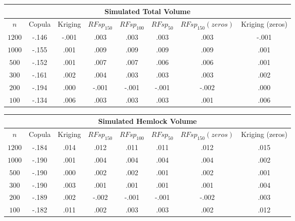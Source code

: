 \documentclass{article}
\begin{document}
\begin{center}
	\begin{singlespace}
\begin{tabular}{|| c | c c c c c c c ||}
\hline
\multicolumn{8}{||c||}{Simulated Total Volume} \\
\hline
$n$ & Copula & Kriging & $RFsp_{150}$ & $RFsp_{100}$ & $RFsp_{50}$ & $RFsp_{150}(zeros)$ & Kriging (zeros) \\ [.5ex] 
\hline\hline
$1200$ & \cellcolor{gray}-.146 & \cellcolor{cyan}-.001 & .003 & .003 & .003 & .003 & \cellcolor{cyan}-.001 \\
$1000$ & \cellcolor{gray}-.155 & \cellcolor{cyan}.001 & .009 & .009 & .009 & .009 & \cellcolor{cyan}.001 \\
$500$ & \cellcolor{gray}-.152 & \cellcolor{cyan}.001 & .007 & .007 & .006 & .006 & \cellcolor{cyan}.001 \\
$300$ & \cellcolor{gray}-.161 & \cellcolor{cyan}.002 & .004 & .003 & .003 & .003 & \cellcolor{cyan}.002 \\
$200$ & \cellcolor{gray}-.194 & \cellcolor{cyan}.000 & -.001 & -.001 & -.001 & -.002 & \cellcolor{cyan}.000 \\
$100$ & \cellcolor{gray}-.134 & .006 & .003 & .003 & .003 & \cellcolor{cyan}.001 & .006 \\ [.5ex] 
\hline
\end{tabular}
\end{singlespace}
\end{center}

\begin{center}
	\begin{singlespace}
\begin{tabular}{|| c | c c c c c c c ||}
\hline
\multicolumn{8}{||c||}{Simulated Hemlock Volume} \\
\hline
$n$ & Copula & Kriging & $RFsp_{150}$ & $RFsp_{100}$ & $RFsp_{50}$ & $RFsp_{150}(zeros)$ & Kriging (zeros) \\ [.5ex] 
\hline\hline
$1200$ & \cellcolor{gray}-.184 & .014 & .012 & \cellcolor{cyan}.011 & \cellcolor{cyan}.011 & .012 & .015 \\
$1000$ & \cellcolor{gray}-.190 & \cellcolor{cyan}.001 & .004 & .004 & .004 & .004 & .002 \\
$500$ & \cellcolor{gray}-.190 & \cellcolor{cyan}.000 & .002 & .002 & .001 & .002 & .001 \\
$300$ & \cellcolor{gray}-.190 & .003 & \cellcolor{cyan}.001 & \cellcolor{cyan}.001 & \cellcolor{cyan}.001 & \cellcolor{cyan}.001 & .004 \\
$200$ & \cellcolor{gray}-.189 & .002 & -.002 & \cellcolor{cyan}-.001 & \cellcolor{cyan}-.001 & -.002 & .003 \\
$100$ & \cellcolor{gray}-.182 & .011 & \cellcolor{cyan}.002 & .003 & .003 & \cellcolor{cyan}.002 & .012 \\ [.5ex] 
\hline
\end{tabular}
\end{singlespace}
\end{center}
\end{document}
